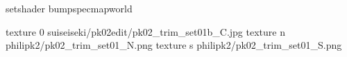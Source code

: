 setshader bumpspecmapworld

texture 0 suiseiseki/pk02edit/pk02_trim_set01b_C.jpg
texture n philipk2/pk02_trim_set01_N.png
texture s philipk2/pk02_trim_set01_S.png

